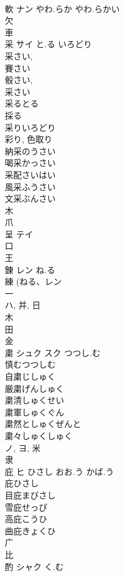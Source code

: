 \documentclass[8pt]{extreport}
\begin{document}
\begin{CJK}{UTF8}{min}
\\	軟	ナン	やわ.らか やわ.らかい	
\\	欠 
\\	車 
\\	采	サイ	と.る いろどり	
\\	采さい, 
\\	賽さい 
\\	骰さい, 
\\	采さい 
\\	采るとる 
\\	採る 
\\	采りいろどり 
\\	彩り, 色取り 
\\	納采のうさい 
\\	喝采かっさい 
\\	采配さいはい 
\\	風采ふうさい 
\\	文采ぶんさい 
\\	木 
\\	爪 
\\	呈	テイ		
\\	口 
\\	王 
\\	錬	レン	ね.る	
\\	練 (ねる、レン 
\\	一 
\\	ハ, 并, 日 
\\	木 
\\	田 
\\	金 
\\	粛	シュク スク	つつし.む	
\\	慎むつつしむ 
\\	自粛じしゅく 
\\	厳粛げんしゅく 
\\	粛清しゅくせい 
\\	粛軍しゅくぐん 
\\	粛然としゅくぜんと 
\\	粛々しゅくしゅく 
\\	ノ, ヨ, 米 
\\	隶 
\\	庇	ヒ	ひさし おお.う かば.う	
\\	庇ひさし 
\\	目庇まびさし 
\\	雪庇せっぴ 
\\	高庇こうひ 
\\	曲庇きょくひ 
\\	广 
\\	比 
\\	酌	シャク	く.む	

\end{CJK}
\end{document}
